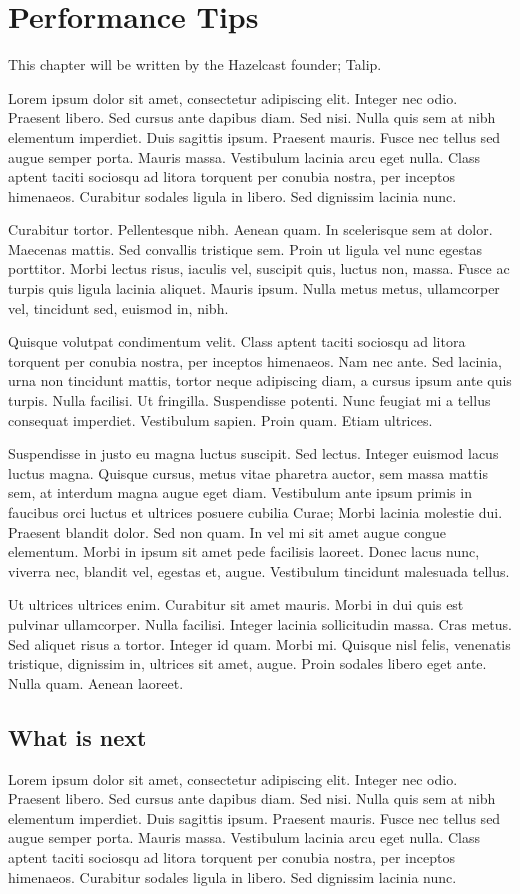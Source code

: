 \chapter{Performance Tips}

This chapter will be written by the Hazelcast founder; Talip.

Lorem ipsum dolor sit amet, consectetur adipiscing elit. Integer nec odio. Praesent libero. Sed cursus ante dapibus diam. Sed nisi. Nulla quis sem at nibh elementum imperdiet. Duis sagittis ipsum. Praesent mauris. Fusce nec tellus sed augue semper porta. Mauris massa. Vestibulum lacinia arcu eget nulla. Class aptent taciti sociosqu ad litora torquent per conubia nostra, per inceptos himenaeos. Curabitur sodales ligula in libero. Sed dignissim lacinia nunc. 

Curabitur tortor. Pellentesque nibh. Aenean quam. In scelerisque sem at dolor. Maecenas mattis. Sed convallis tristique sem. Proin ut ligula vel nunc egestas porttitor. Morbi lectus risus, iaculis vel, suscipit quis, luctus non, massa. Fusce ac turpis quis ligula lacinia aliquet. Mauris ipsum. Nulla metus metus, ullamcorper vel, tincidunt sed, euismod in, nibh. 

Quisque volutpat condimentum velit. Class aptent taciti sociosqu ad litora torquent per conubia nostra, per inceptos himenaeos. Nam nec ante. Sed lacinia, urna non tincidunt mattis, tortor neque adipiscing diam, a cursus ipsum ante quis turpis. Nulla facilisi. Ut fringilla. Suspendisse potenti. Nunc feugiat mi a tellus consequat imperdiet. Vestibulum sapien. Proin quam. Etiam ultrices. 

Suspendisse in justo eu magna luctus suscipit. Sed lectus. Integer euismod lacus luctus magna. Quisque cursus, metus vitae pharetra auctor, sem massa mattis sem, at interdum magna augue eget diam. Vestibulum ante ipsum primis in faucibus orci luctus et ultrices posuere cubilia Curae; Morbi lacinia molestie dui. Praesent blandit dolor. Sed non quam. In vel mi sit amet augue congue elementum. Morbi in ipsum sit amet pede facilisis laoreet. Donec lacus nunc, viverra nec, blandit vel, egestas et, augue. Vestibulum tincidunt malesuada tellus. 

Ut ultrices ultrices enim. Curabitur sit amet mauris. Morbi in dui quis est pulvinar ullamcorper. Nulla facilisi. Integer lacinia sollicitudin massa. Cras metus. Sed aliquet risus a tortor. Integer id quam. Morbi mi. Quisque nisl felis, venenatis tristique, dignissim in, ultrices sit amet, augue. Proin sodales libero eget ante. Nulla quam. Aenean laoreet. 

\section{What is next}

Lorem ipsum dolor sit amet, consectetur adipiscing elit. Integer nec odio. Praesent libero. Sed cursus ante dapibus diam. Sed nisi. Nulla quis sem at nibh elementum imperdiet. Duis sagittis ipsum. Praesent mauris. Fusce nec tellus sed augue semper porta. Mauris massa. Vestibulum lacinia arcu eget nulla. Class aptent taciti sociosqu ad litora torquent per conubia nostra, per inceptos himenaeos. Curabitur sodales ligula in libero. Sed dignissim lacinia nunc. 
